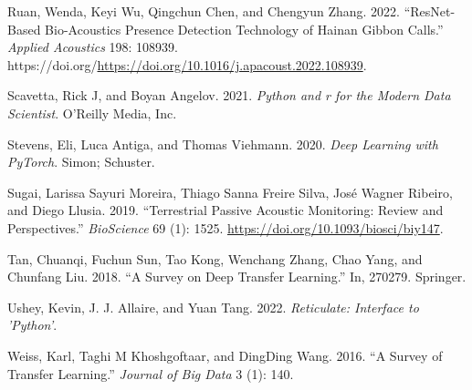 \documentclass{article}
\newlength{\cslhangindent}
\newlength{\cslentryspacingunit} %
\newenvironment{CSLReferences}[2] %
 {%
  \setlength{\parindent}{0pt}
  \ifodd #1
  \let\oldpar\par
  \def\par{\hangindent=\cslhangindent\oldpar}
  \fi
  \setlength{\parskip}{#2\cslentryspacingunit}
 }%
 {}
\begin{document}
\begin{CSLReferences}{1}{0}
\leavevmode{}%
Ruan, Wenda, Keyi Wu, Qingchun Chen, and Chengyun Zhang. 2022.
{``ResNet-Based Bio-Acoustics Presence Detection Technology of Hainan
Gibbon Calls.''} \emph{Applied Acoustics} 198: 108939.
https://doi.org/\url{https://doi.org/10.1016/j.apacoust.2022.108939}.

\leavevmode{}%
Scavetta, Rick J, and Boyan Angelov. 2021. \emph{Python and r for the
Modern Data Scientist}. O'Reilly Media, Inc.

\leavevmode{}%
Stevens, Eli, Luca Antiga, and Thomas Viehmann. 2020. \emph{Deep
Learning with PyTorch}. Simon; Schuster.

\leavevmode{}%
Sugai, Larissa Sayuri Moreira, Thiago Sanna Freire Silva, José Wagner
Ribeiro, and Diego Llusia. 2019. {``Terrestrial Passive Acoustic
Monitoring: Review and Perspectives.''} \emph{BioScience} 69 (1): 1525.
\url{https://doi.org/10.1093/biosci/biy147}.

\leavevmode{}%
Tan, Chuanqi, Fuchun Sun, Tao Kong, Wenchang Zhang, Chao Yang, and
Chunfang Liu. 2018. {``A Survey on Deep Transfer Learning.''} In,
270279. Springer.

\leavevmode{}%
Ushey, Kevin, J. J. Allaire, and Yuan Tang. 2022. \emph{Reticulate:
Interface to 'Python'}.

\leavevmode{}%
Weiss, Karl, Taghi M Khoshgoftaar, and DingDing Wang. 2016. {``A Survey
of Transfer Learning.''} \emph{Journal of Big Data} 3 (1): 140.

\end{CSLReferences}



\end{document}

